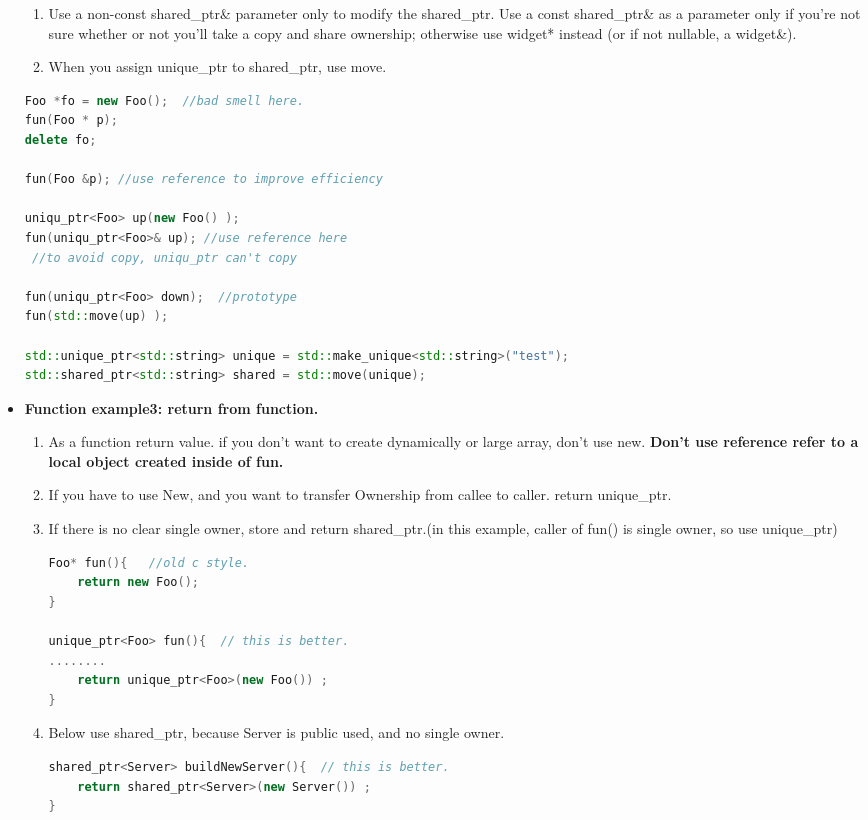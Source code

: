 \documentclass[a4paper,12pt,twoside]{book}
\begin{document}
\begin{itemize}
\begin{enumerate}
\item Use a non-const shared\_ptr\& parameter only to modify the shared\_ptr. Use a const shared\_ptr\& as a parameter only if you're not sure whether or not you'll take a copy and share ownership; otherwise use widget* instead (or if not nullable, a widget\&).

\item When you assign unique\_ptr to shared\_ptr, use move.
\end{enumerate}

\begin{lstlisting}[frame=single, language=c++]
Foo *fo = new Foo();  //bad smell here.
fun(Foo * p);
delete fo;

fun(Foo &p); //use reference to improve efficiency

uniqu_ptr<Foo> up(new Foo() );
fun(uniqu_ptr<Foo>& up); //use reference here
 //to avoid copy, uniqu_ptr can't copy

fun(uniqu_ptr<Foo> down);  //prototype
fun(std::move(up) );

std::unique_ptr<std::string> unique = std::make_unique<std::string>("test");
std::shared_ptr<std::string> shared = std::move(unique);
\end{lstlisting}

\item \textbf{Function example3: return from function.}
\begin{enumerate}
\item As a function return value. if you don't want to create dynamically or large array, don't use new. \textbf{Don't  use reference refer to a local object created inside of fun.}

\item If you have to use New, and you want to transfer Ownership from callee to caller. return unique\_ptr.

\item If there is no clear single owner, store and return shared\_ptr.(in this example, caller of fun() is single owner, so use unique\_ptr)

\begin{lstlisting}[frame=single, language=c++]
Foo* fun(){   //old c style.
	return new Foo();
}

unique_ptr<Foo> fun(){  // this is better.
........
	return unique_ptr<Foo>(new Foo()) ;
}
\end{lstlisting}

\item Below use shared\_ptr, because Server is public used, and no single owner.
\begin{lstlisting}[frame=single, language=c++]
shared_ptr<Server> buildNewServer(){  // this is better.
	return shared_ptr<Server>(new Server()) ;
}


\end{lstlisting}
\end{enumerate}
\end{itemize}
\end{document}
